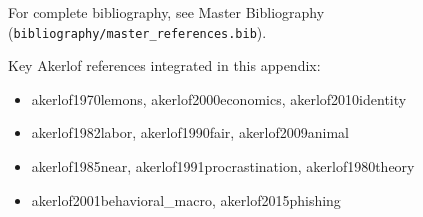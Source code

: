 \nocite{bcm_master}

For complete bibliography, see Master Bibliography (\texttt{bibliography/master\_references.bib}).

Key Akerlof references integrated in this appendix:
\begin{itemize}[nosep]
    \item akerlof1970lemons, akerlof2000economics, akerlof2010identity
    \item akerlof1982labor, akerlof1990fair, akerlof2009animal
    \item akerlof1985near, akerlof1991procrastination, akerlof1980theory
    \item akerlof2001behavioral\_macro, akerlof2015phishing
\end{itemize}


